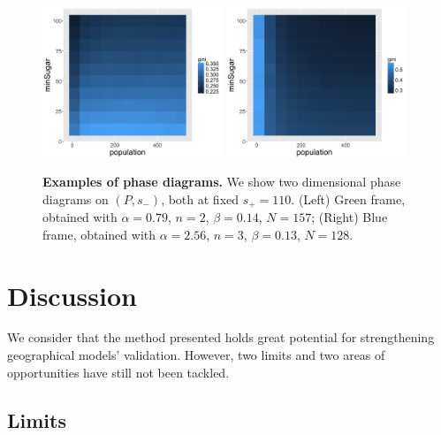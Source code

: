 \documentclass[3p,times,procedia]{elsarticle}
\begin{document}
\begin{figure}
\centering
\includegraphics[width=0.48\textwidth]{figures/phasediagram_id27_maxSugar110}
\includegraphics[width=0.48\textwidth]{figures/phasediagram_id0_maxSugar110}
\caption{\textbf{Examples of phase diagrams.} We show two dimensional phase diagrams on $(P,s_-)$, both at fixed $s_+ = 110$. (Left) Green frame, obtained with $\alpha = 0.79$, $n=2$, $\beta = 0.14$, $N=157$; (Right) Blue frame, obtained with $\alpha = 2.56$, $n=3$, $\beta = 0.13$, $N=128$.}
\label{fig:sugarscape-phasediagrams}
\end{figure}


\section{Discussion}

We consider that the method presented holds great potential for strengthening geographical models' validation. However, two limits and two areas of opportunities have still not been tackled. 

\subsection{Limits}
\end{document}
